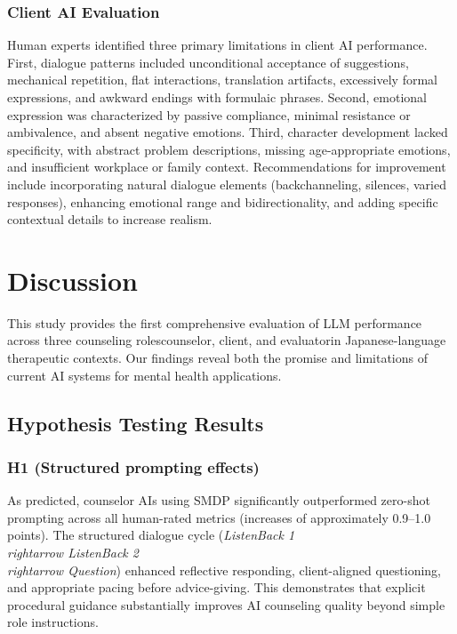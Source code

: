 \documentclass{wiley-article}
\begin{document}
\subsubsection*{Client AI Evaluation}

Human experts identified three primary limitations in client AI performance. First, dialogue patterns included unconditional acceptance of suggestions, mechanical repetition, flat interactions, translation artifacts, excessively formal expressions, and awkward endings with formulaic phrases. Second, emotional expression was characterized by passive compliance, minimal resistance or ambivalence, and absent negative emotions. Third, character development lacked specificity, with abstract problem descriptions, missing age-appropriate emotions, and insufficient workplace or family context. Recommendations for improvement include incorporating natural dialogue elements (backchanneling, silences, varied responses), enhancing emotional range and bidirectionality, and adding specific contextual details to increase realism.




\section*{Discussion}

This study provides the first comprehensive evaluation of LLM performance across three counseling roles\textemdash{}counselor, client, and evaluator\textemdash{}in Japanese-language therapeutic contexts. Our findings reveal both the promise and limitations of current AI systems for mental health applications.

\subsection*{Hypothesis Testing Results}

\subsubsection*{H1 (Structured prompting effects)}
As predicted, counselor AIs using SMDP significantly outperformed zero-shot prompting across all human-rated metrics (increases of approximately 0.9–1.0 points). The structured dialogue cycle (\emph{Listen\textendash{}Back 1 \\rightarrow{} Listen\textendash{}Back 2 \\rightarrow{} Question}) enhanced reflective responding, client-aligned questioning, and appropriate pacing before advice-giving. This demonstrates that explicit procedural guidance substantially improves AI counseling quality beyond simple role instructions.
\end{document}
